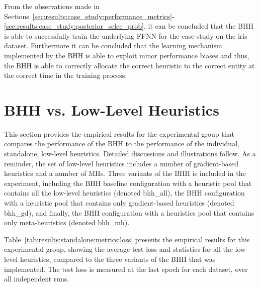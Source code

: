 From the observations made in Sections~\ref{sec:results:case_study:performance_metrics}-\ref{sec:results:case_study:posterior_selec_prob}, it can be concluded that the \acs{BHH} is able to successfully train the underlying \acs{FFNN} for the case study on the iris dataset. Furthermore it can be concluded that the learning mechanism implemented by the \acs{BHH} is able to exploit minor performance biases and thus, the \acs{BHH} is able to correctly allocate the correct heuristic to the correct entity at the correct time in the training process.

\section{BHH vs. Low-Level Heuristics}\label{sec:results:standalone}

This section provides the empirical results for the experimental group that compares the performance of the \acs{BHH} to the performance of the individual, standalone, low-level heuristics. Detailed discussions and illustrations follow. As a reminder, the set of low-level heuristics includes a number of gradient-based heuristics and a number of \acp{MH}. Three variants of the \acs{BHH} is included in the experiment, including the \acs{BHH} baseline configuration with a heuristic pool that contains all the low-level heuristics (denoted bhh\_all), the \acs{BHH} configuration with a heuristic pool that contains only gradient-based heuristics (denoted bhh\_gd), and finally, the \acs{BHH} configuration with a heuristics pool that contains only meta-heuristics (denoted bhh\_mh).

Table~\ref{tab:results:standalone:metrics:loss} presents the empirical results for this experimental group, showing the average test loss and statistics for all the low-level heuristics, compared to the three variants of the \acs{BHH} that was implemented. The test loss is measured at the last epoch for each dataset, over all independent runs.

